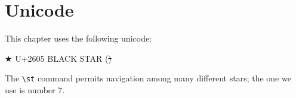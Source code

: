 \begin{fence}
\begin{code}%
\>[0]%
\>[1747I]\AgdaSymbol{:}\AgdaSpace{}%
\AgdaSpace{}%
\AgdaSymbol{\{}\AgdaSymbol{\}}\AgdaSpace{}%
\AgdaSymbol{\{}\AgdaSpace{}%
\AgdaSpace{}%
\AgdaSymbol{:}\AgdaSpace{}%
\AgdaSpace{}%
\AgdaOperator{\AgdaInductiveConstructor{,}}\AgdaSpace{}%
\AgdaSpace{}%
\AgdaSpace{}%
\AgdaSymbol{\}}\<%
\\
\>[.][@{}l@{}]\<[1747I]%
\>[9]%
\>[1758I]\AgdaSpace{}%
\AgdaSpace{}%
\<%
\\
\>[.][@{}l@{}]\<[1758I]%
\>[11]\AgdaComment{----------}\<%
\\
%
\>[9]\AgdaSpace{}%
\AgdaSpace{}%
\AgdaSpace{}%
\AgdaSpace{}%
\AgdaSpace{}%
\<%
\\
\>[0]\AgdaSpace{}%
\AgdaSymbol{(}\AgdaSpace{}%
\AgdaSymbol{)}\AgdaSpace{}%
\AgdaSymbol{=}\AgdaSpace{}%
\AgdaSpace{}%
\AgdaSpace{}%
\<%
\\
\>[0]\AgdaSpace{}%
\AgdaSymbol{(}\AgdaSpace{}%
\AgdaSpace{}%
\AgdaSpace{}%
\AgdaSpace{}%
\AgdaSymbol{)}\AgdaSpace{}%
\AgdaSymbol{=}\AgdaSpace{}%
\AgdaSpace{}%
\AgdaSpace{}%
\AgdaSpace{}%
\AgdaSpace{}%
\AgdaSpace{}%
\AgdaSpace{}%
\AgdaSpace{}%
\<%
\end{code}
\end{fence}

\hypertarget{unicode}{%
\section{Unicode}\label{unicode}}

This chapter uses the following unicode:

\begin{myDisplay}
★  U+2605  BLACK STAR (\st)
\end{myDisplay}

The \texttt{\textbackslash{}st} command permits navigation among many
different stars; the one we use is number 7.


